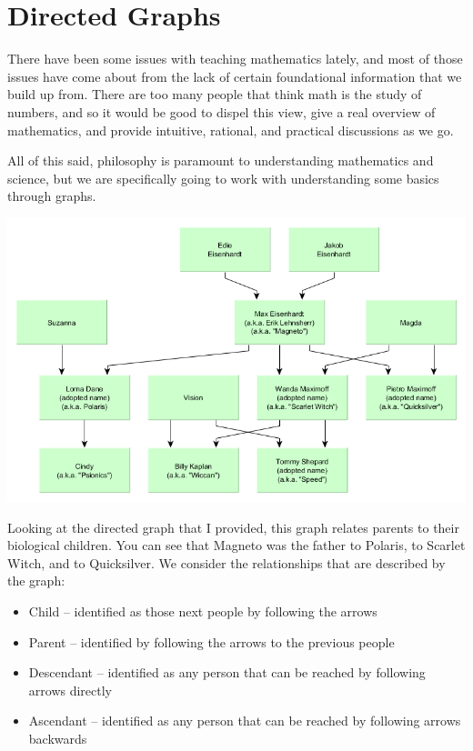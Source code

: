 \chapter{Directed Graphs}

There have been some issues with teaching mathematics lately, and most of those issues have come about from the lack of certain foundational information that we build up from. There are too many people that think math is the study of numbers, and so it would be good to dispel this view, give a real overview of mathematics, and provide intuitive, rational, and practical discussions as we go.

All of this said, philosophy is paramount to understanding mathematics and science, but we are specifically going to work with understanding some basics through graphs.

\includegraphics[scale=0.55]{01/XMenAvengersFamilyTree.png}

Looking at the directed graph that I provided, this graph relates parents to their biological children. You can see that Magneto was the father to Polaris, to Scarlet Witch, and to Quicksilver. We consider the relationships that are described by the graph:

\begin{itemize}
    \item Child -- identified as those next people by following the arrows
    \item Parent -- identified by following the arrows to the previous people
    \item Descendant -- identified as any person that can be reached by following arrows directly
    \item Ascendant -- identified as any person that can be reached by following arrows backwards
\end{itemize}

